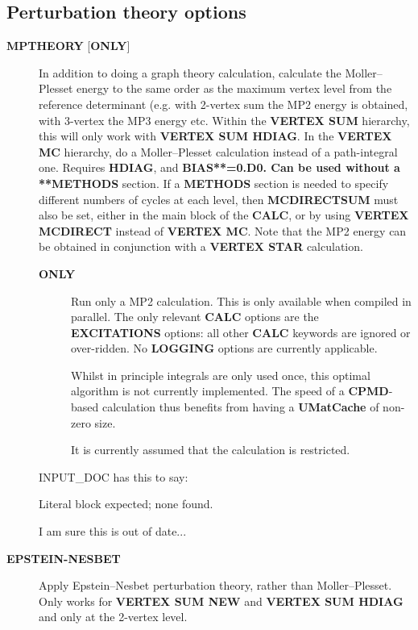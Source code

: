 \documentclass[openany,a4paper,10pt]{manual}
\begin{document}
\subsection{Perturbation theory options}
\begin{description}
\item[\textbf{MPTHEORY} {[}\textbf{ONLY}{]}]
In addition to doing a graph theory calculation, calculate the Moller--Plesset
energy to the same order as the maximum vertex level from the
reference determinant (e.g. with 2-vertex sum the MP2 energy is
obtained, with 3-vertex the MP3 energy etc.  Within the \textbf{VERTEX SUM}
hierarchy, this will only work with \textbf{VERTEX SUM HDIAG}.
In the \textbf{VERTEX MC} hierarchy, do a Moller--Plesset calculation
instead of a path-integral one.  Requires \textbf{HDIAG}, and \textbf{BIAS**=0.D0.
Can be used without a **METHODS} section.  If a \textbf{METHODS} section is
needed to specify different numbers of cycles at each level, then
\textbf{MCDIRECTSUM} must also be set, either in the main block of the \textbf{CALC},
or by using \textbf{VERTEX MCDIRECT} instead of \textbf{VERTEX MC}.
Note that the MP2 energy
can be obtained in conjunction with a \textbf{VERTEX STAR} calculation.
\begin{description}
\item[\textbf{ONLY}]
Run only a MP2 calculation.  This is only available when
compiled in parallel.  The only relevant \textbf{CALC} options are the
\textbf{EXCITATIONS} options: all other \textbf{CALC} keywords are ignored
or over-ridden.  No \textbf{LOGGING} options are currently applicable.

Whilst in principle integrals are only used once, this optimal
algorithm is not currently implemented.  The speed of a \textbf{CPMD}-based
calculation thus benefits from having a \textbf{UMatCache} of non-zero size.

\begin{notice}[warning]
It is currently assumed that the calculation is restricted.
\end{notice}

\end{description}

\begin{notice}[note]
INPUT\_DOC has this to say:

Literal block expected; none found.


I am sure this is out of date...
\end{notice}

\item[\textbf{EPSTEIN-NESBET}]
Apply Epstein--Nesbet perturbation theory, rather than
Moller--Plesset.  Only works for \textbf{VERTEX SUM NEW} and \textbf{VERTEX
SUM HDIAG} and only at the 2-vertex level.


\end{description}
\end{document}
